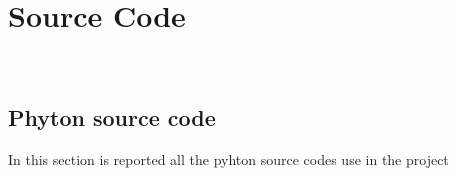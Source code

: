 
\chapter{Source Code}
\label{cap:source code}

\\

\section{Phyton source code}

In this section is reported all the pyhton source codes use in the project
